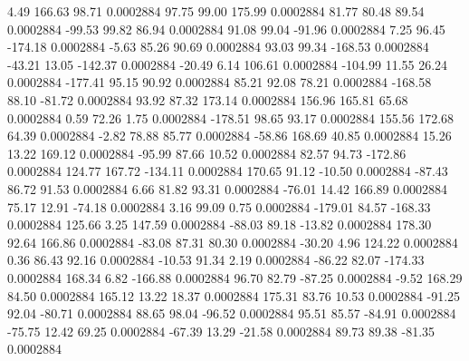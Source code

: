         4.49      166.63       98.71     0.0002884
       97.75       99.00      175.99     0.0002884
       81.77       80.48       89.54     0.0002884
      -99.53       99.82       86.94     0.0002884
       91.08       99.04      -91.96     0.0002884
        7.25       96.45     -174.18     0.0002884
       -5.63       85.26       90.69     0.0002884
       93.03       99.34     -168.53     0.0002884
      -43.21       13.05     -142.37     0.0002884
      -20.49        6.14      106.61     0.0002884
     -104.99       11.55       26.24     0.0002884
     -177.41       95.15       90.92     0.0002884
       85.21       92.08       78.21     0.0002884
     -168.58       88.10      -81.72     0.0002884
       93.92       87.32      173.14     0.0002884
      156.96      165.81       65.68     0.0002884
        0.59       72.26        1.75     0.0002884
     -178.51       98.65       93.17     0.0002884
      155.56      172.68       64.39     0.0002884
       -2.82       78.88       85.77     0.0002884
      -58.86      168.69       40.85     0.0002884
       15.26       13.22      169.12     0.0002884
      -95.99       87.66       10.52     0.0002884
       82.57       94.73     -172.86     0.0002884
      124.77      167.72     -134.11     0.0002884
      170.65       91.12      -10.50     0.0002884
      -87.43       86.72       91.53     0.0002884
        6.66       81.82       93.31     0.0002884
      -76.01       14.42      166.89     0.0002884
       75.17       12.91      -74.18     0.0002884
        3.16       99.09        0.75     0.0002884
     -179.01       84.57     -168.33     0.0002884
      125.66        3.25      147.59     0.0002884
      -88.03       89.18      -13.82     0.0002884
      178.30       92.64      166.86     0.0002884
      -83.08       87.31       80.30     0.0002884
      -30.20        4.96      124.22     0.0002884
        0.36       86.43       92.16     0.0002884
      -10.53       91.34        2.19     0.0002884
      -86.22       82.07     -174.33     0.0002884
      168.34        6.82     -166.88     0.0002884
       96.70       82.79      -87.25     0.0002884
       -9.52      168.29       84.50     0.0002884
      165.12       13.22       18.37     0.0002884
      175.31       83.76       10.53     0.0002884
      -91.25       92.04      -80.71     0.0002884
       88.65       98.04      -96.52     0.0002884
       95.51       85.57      -84.91     0.0002884
      -75.75       12.42       69.25     0.0002884
      -67.39       13.29      -21.58     0.0002884
       89.73       89.38      -81.35     0.0002884
